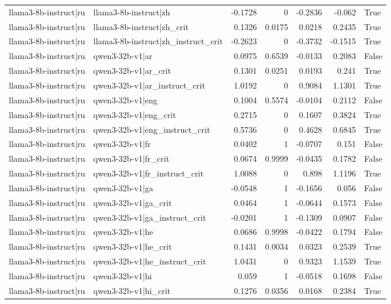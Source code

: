 \begin{table}
\begin{tabular}{l l r r r r l}
llama3-8b-instruct|ru & llama3-8b-instruct|zh & -0.1728 & 0 & -0.2836 & -0.062 & True \\
llama3-8b-instruct|ru & llama3-8b-instruct|zh_crit & 0.1326 & 0.0175 & 0.0218 & 0.2435 & True \\
llama3-8b-instruct|ru & llama3-8b-instruct|zh_instruct_crit & -0.2623 & 0 & -0.3732 & -0.1515 & True \\
llama3-8b-instruct|ru & qwen3-32b-v1|ar & 0.0975 & 0.6539 & -0.0133 & 0.2083 & False \\
llama3-8b-instruct|ru & qwen3-32b-v1|ar_crit & 0.1301 & 0.0251 & 0.0193 & 0.241 & True \\
llama3-8b-instruct|ru & qwen3-32b-v1|ar_instruct_crit & 1.0192 & 0 & 0.9084 & 1.1301 & True \\
llama3-8b-instruct|ru & qwen3-32b-v1|eng & 0.1004 & 0.5574 & -0.0104 & 0.2112 & False \\
llama3-8b-instruct|ru & qwen3-32b-v1|eng_crit & 0.2715 & 0 & 0.1607 & 0.3824 & True \\
llama3-8b-instruct|ru & qwen3-32b-v1|eng_instruct_crit & 0.5736 & 0 & 0.4628 & 0.6845 & True \\
llama3-8b-instruct|ru & qwen3-32b-v1|fr & 0.0402 & 1 & -0.0707 & 0.151 & False \\
llama3-8b-instruct|ru & qwen3-32b-v1|fr_crit & 0.0674 & 0.9999 & -0.0435 & 0.1782 & False \\
llama3-8b-instruct|ru & qwen3-32b-v1|fr_instruct_crit & 1.0088 & 0 & 0.898 & 1.1196 & True \\
llama3-8b-instruct|ru & qwen3-32b-v1|ga & -0.0548 & 1 & -0.1656 & 0.056 & False \\
llama3-8b-instruct|ru & qwen3-32b-v1|ga_crit & 0.0464 & 1 & -0.0644 & 0.1573 & False \\
llama3-8b-instruct|ru & qwen3-32b-v1|ga_instruct_crit & -0.0201 & 1 & -0.1309 & 0.0907 & False \\
llama3-8b-instruct|ru & qwen3-32b-v1|he & 0.0686 & 0.9998 & -0.0422 & 0.1794 & False \\
llama3-8b-instruct|ru & qwen3-32b-v1|he_crit & 0.1431 & 0.0034 & 0.0323 & 0.2539 & True \\
llama3-8b-instruct|ru & qwen3-32b-v1|he_instruct_crit & 1.0431 & 0 & 0.9323 & 1.1539 & True \\
llama3-8b-instruct|ru & qwen3-32b-v1|hi & 0.059 & 1 & -0.0518 & 0.1698 & False \\
llama3-8b-instruct|ru & qwen3-32b-v1|hi_crit & 0.1276 & 0.0356 & 0.0168 & 0.2384 & True \\

\end{tabular}
\end{table}
